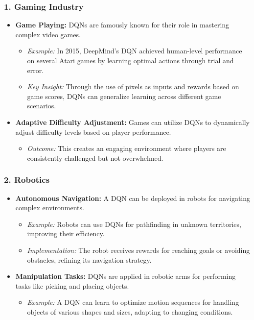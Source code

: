 \documentclass[aspectratio=169]{beamer}
\begin{document}
\begin{frame}[fragile]
    \frametitle{1. Gaming Industry}
    \begin{itemize}
        \item \textbf{Game Playing:} DQNs are famously known for their role in mastering complex video games.
            \begin{itemize}
                \item \textit{Example:} In 2015, DeepMind's DQN achieved human-level performance on several Atari games by learning optimal actions through trial and error.
                \item \textit{Key Insight:} Through the use of pixels as inputs and rewards based on game scores, DQNs can generalize learning across different game scenarios.
            \end{itemize}
        
        \item \textbf{Adaptive Difficulty Adjustment:} Games can utilize DQNs to dynamically adjust difficulty levels based on player performance.
            \begin{itemize}
                \item \textit{Outcome:} This creates an engaging environment where players are consistently challenged but not overwhelmed.
            \end{itemize}
    \end{itemize}
\end{frame}

\begin{frame}[fragile]
    \frametitle{2. Robotics}
    \begin{itemize}
        \item \textbf{Autonomous Navigation:} A DQN can be deployed in robots for navigating complex environments.
            \begin{itemize}
                \item \textit{Example:} Robots can use DQNs for pathfinding in unknown territories, improving their efficiency.
                \item \textit{Implementation:} The robot receives rewards for reaching goals or avoiding obstacles, refining its navigation strategy.
            \end{itemize}
        
        \item \textbf{Manipulation Tasks:} DQNs are applied in robotic arms for performing tasks like picking and placing objects.
            \begin{itemize}
                \item \textit{Example:} A DQN can learn to optimize motion sequences for handling objects of various shapes and sizes, adapting to changing conditions.
            \end{itemize}
    \end{itemize}
\end{frame}
\end{document}
